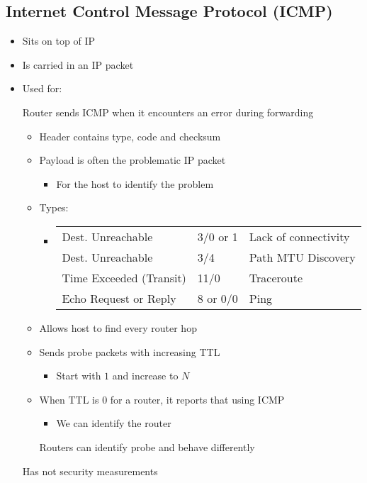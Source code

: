\subsection{Internet Control Message Protocol (ICMP)}
\begin{itemize}
    \item Sits on top of IP
    \item Is carried in an IP packet
    \item Used for:
        \begin{itemize}
             Router sends ICMP when it encounters an error during forwarding
             
        \end{itemize} 
        \begin{itemize}
            \item Header contains type, code and checksum
            \item Payload is often the problematic IP packet
                \begin{itemize}
                    \item For the host to identify the problem
                \end{itemize}
            \item Types:
                \begin{itemize}
                    \item 
\begin{tabular}{| l | l | l}
    Dest. Unreachable & 3/0 or 1 & Lack of connectivity\\
    Dest. Unreachable & 3/4 & Path MTU Discovery\\
    Time Exceeded (Transit) & 11/0 & Traceroute\\
    Echo Request or Reply & 8 or 0/0 & Ping
\end{tabular}
                \end{itemize}
        \end{itemize}
        \begin{itemize}
            \item Allows host to find every router hop
            \item Sends probe packets with increasing TTL
                \begin{itemize}
                    \item Start with $1$ and increase to $N$
                \end{itemize}
            \item When TTL is $0$ for a router, it reports that using ICMP
                \begin{itemize}
                    \item We can identify the router
                \end{itemize}
            \icon Routers can identify probe and behave differently
        \end{itemize}
    \icon Has not security measurements
\end{itemize}

